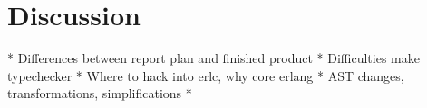 \chapter{Discussion}

* Differences between report plan and finished product
* Difficulties make typechecker
* Where to hack into erlc, why core erlang
* AST changes, transformations, simplifications
* 

